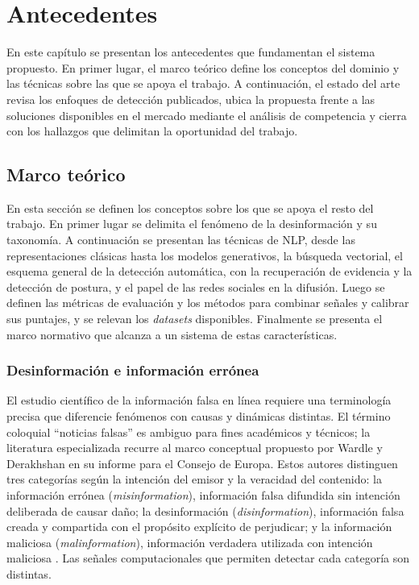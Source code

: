 \chapter{Antecedentes}
\label{ch:antecedentes}

En este capítulo se presentan los antecedentes que fundamentan el sistema propuesto. En primer lugar, el marco teórico define los conceptos del dominio y las técnicas sobre las que se apoya el trabajo. A continuación, el estado del arte revisa los enfoques de detección publicados, ubica la propuesta frente a las soluciones disponibles en el mercado mediante el análisis de competencia y cierra con los hallazgos que delimitan la oportunidad del trabajo.

\section{Marco teórico}

En esta sección se definen los conceptos sobre los que se apoya el resto del trabajo. En primer lugar se delimita el fenómeno de la desinformación y su taxonomía. A continuación se presentan las técnicas de NLP, desde las representaciones clásicas hasta los modelos generativos, la búsqueda vectorial, el esquema general de la detección automática, con la recuperación de evidencia y la detección de postura, y el papel de las redes sociales en la difusión. Luego se definen las métricas de evaluación y los métodos para combinar señales y calibrar sus puntajes, y se relevan los \textit{datasets} disponibles. Finalmente se presenta el marco normativo que alcanza a un sistema de estas características.

\subsection{Desinformación e información errónea}

El estudio científico de la información falsa en línea requiere una terminología precisa que diferencie fenómenos con causas y dinámicas distintas. El término coloquial \enquote{noticias falsas} es ambiguo para fines académicos y técnicos; la literatura especializada recurre al marco conceptual propuesto por Wardle y Derakhshan en su informe para el Consejo de Europa. Estos autores distinguen tres categorías según la intención del emisor y la veracidad del contenido: la información errónea (\textit{misinformation}), información falsa difundida sin intención deliberada de causar daño; la desinformación (\textit{disinformation}), información falsa creada y compartida con el propósito explícito de perjudicar; y la información maliciosa (\textit{malinformation}), información verdadera utilizada con intención maliciosa \parencite{WardleDerakhshan2017}. Las señales computacionales que permiten detectar cada categoría son distintas.

